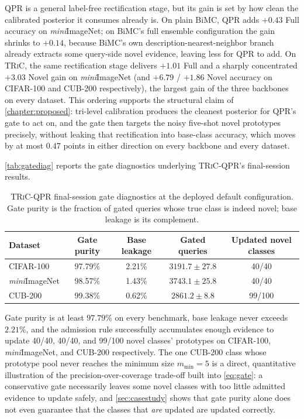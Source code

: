 \documentclass{iutbscthesis}
\begin{document}
QPR is a general label-free rectification stage, but its gain is set by how clean the calibrated posterior it consumes already is. On plain BiMC, QPR adds $+0.43$ Full accuracy on \emph{mini}ImageNet; on BiMC's full ensemble configuration the gain shrinks to $+0.14$, because BiMC's own description-nearest-neighbor branch already extracts some query-side novel evidence, leaving less for QPR to add. On \textsc{TRiC}, the same rectification stage delivers $+1.01$ Full and a sharply concentrated $+3.03$ Novel gain on \emph{mini}ImageNet (and $+6.79$ / $+1.86$ Novel accuracy on CIFAR-100 and CUB-200 respectively), the largest gain of the three backbones on every dataset. This ordering supports the structural claim of \autoref{chapter:proposed}: tri-level calibration produces the cleanest posterior for QPR's gate to act on, and the gate then targets the noisy five-shot novel prototypes precisely, without leaking that rectification into base-class accuracy, which moves by at most $0.47$ points in either direction on every backbone and every dataset.

\autoref{tab:gatediag} reports the gate diagnostics underlying \textsc{TRiC}-QPR's final-session results.

\begin{table}[H]
    \centering
    \begin{tabular}{l c c c c}
        \toprule
        Dataset & Gate purity & Base leakage & Gated queries & Updated novel classes \\
        \midrule
        CIFAR-100 & 97.79\% & 2.21\% & $3191.7 \pm 27.8$ & 40/40 \\
        \emph{mini}ImageNet & 98.57\% & 1.43\% & $3743.1 \pm 25.8$ & 40/40 \\
        CUB-200 & 99.38\% & 0.62\% & $2861.2 \pm 8.8$ & 99/100 \\
        \bottomrule
    \end{tabular}
    \caption{\textsc{TRiC}-QPR final-session gate diagnostics at the deployed default configuration. Gate purity is the fraction of gated queries whose true class is indeed novel; base leakage is its complement.}
    \label{tab:gatediag}
\end{table}

Gate purity is at least $97.79\%$ on every benchmark, base leakage never exceeds $2.21\%$, and the admission rule successfully accumulates enough evidence to update 40/40, 40/40, and 99/100 novel classes' prototypes on CIFAR-100, \emph{mini}ImageNet, and CUB-200 respectively. The one CUB-200 class whose prototype pool never reaches the minimum size $m_{\min}=5$ is a direct, quantitative illustration of the precision-over-coverage trade-off built into \autoref{eq:gate}: a conservative gate necessarily leaves some novel classes with too little admitted evidence to update safely, and \autoref{sec:casestudy} shows that gate purity alone does not even guarantee that the classes that \emph{are} updated are updated correctly.
\end{document}
